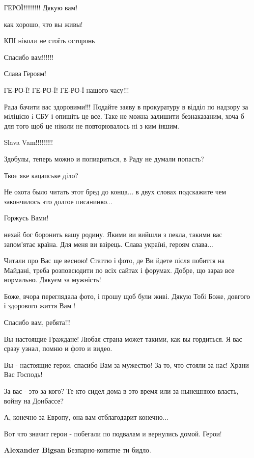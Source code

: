 ГЕРОЇ!!!!!!!!! Дякую вам!

как хорошо, что вы живы!

КПІ ніколи не стоїть осторонь

Спасибо вам!!!!!!

Слава Героям!

ГЕ-РО-Ї! ГЕ-РО-Ї! ГЕ-РО-Ї нашого часу!!!


Рада бачити вас здоровими!!! Подайте заяву в прокуратуру в відділ по надзору за
міліцією i СБУ і опишіть це все. Таке не можна залишити безнаказаним, хоча б для
того щоб це ніколи не повторювалось ні з ким іншим.


Slava Vam!!!!!!!!!

Здобулы, теперь можно и попиариться, в Раду не думали попасть?

Твоє яке кацапське діло?


Не охота было читать этот бред до конца... в двух словах подскажите чем закончилось это долгое писанинко...

Горжусь Вами!


нехай бог боронить вашу родину. Якими ви вийшли з пекла, такими вас запом'ятає
країна. Для меня ви взірець. Слава україні, героям слава...


Читали про Вас ще весною! Статтю і фото, де Ви йдете після побиття на Майдані,
треба розповсюдити по всіх сайтах і форумах. Добре, що зараз все нормально.
Дякуєм за мужність!


Боже, вчора переглядала фото, і прошу щоб були живі. Дякую Тобі Боже, довгого і
здорового життя Вам !

Спасибо вам, ребята!!!

Вы настоящие Граждане! Любая страна может такими, как вы гордиться. Я вас сразу узнал, помню и фото и видео.

Вы - настоящие герои, спасибо Вам за мужество! За то, что стояли за нас! Храни Вас Господь!

\begin{itemize} %
За вас - это за кого? Те кто сидел дома в это время или за нынешнюю власть, войну на Донбассе?

А, конечно за Европу, она вам отблагодарит конечно...

Вот что значит герои - побегали по подвалам и вернулись домой. Герои!

\textbf{Alexander Bigsan} Безпарно-копитне ти бидло.
\end{itemize} %

